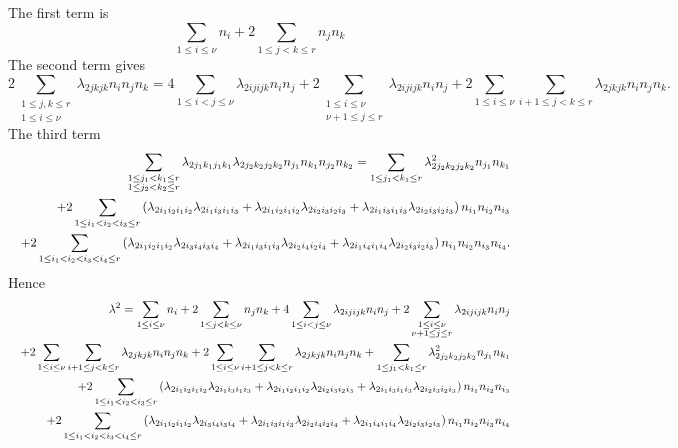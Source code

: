 \documentclass[12pt]{article}
\begin{document}
The first term is 
\begin{equation}
\sum_{1\leq i\leq \nu }n_{i}+2\sum_{1\leq j<k\leq r}n_{j}n_{k}
\end{equation}%
The second term gives 
\begin{equation}
2\sum_{\substack{ 1\leq j,k\leq r  \\ 1\leq i\leq \nu }}\lambda
_{2jkjk}n_{i}n_{j}n_{k}=4\sum_{1\leq i<j\leq \nu }\lambda
_{2ijijk}n_{i}n_{j}+2\sum_{\substack{ 1\leq i\leq \nu  \\ \nu +1\leq j\leq r 
}}\lambda _{2ijijk}n_{i}n_{j}+2\sum_{1\leq i\leq \nu }\sum_{i+1\leq j<k\leq
r}\lambda _{2jkjk}n_{i}n_{j}n_{k}.
\end{equation}%
The third term 
\begin{eqnarray}
&&\sum_{\substack{ 1\leq j_{1}<k_{1}\leq r  \\ 1\leq j_{2}<k_{2}\leq r}}%
\lambda _{2j_{1}k_{1}j_{1}k_{1}}\lambda
_{2j_{2}k_{2}j_{2}k_{2}}n_{j_{1}}n_{k_{1}}n_{j_{2}}n_{k_{2}}=\sum_{1\leq
j_{1}<k_{1}\leq r}\lambda _{2j_{2}k_{2}j_{2}k_{2}}^{2}n_{j_{1}}n_{k_{1}} 
\notag \\
&&+2\sum_{1\leq i_{1}<i_{2}<i_{3}\leq r}\left( \lambda
_{2i_{1}i_{2}i_{1}i_{2}}\lambda _{2i_{1}i_{3}i_{1}i_{3}}+\lambda
_{2i_{1}i_{2}i_{1}i_{2}}\lambda _{2i_{2}i_{3}i_{2}i_{3}}+\lambda
_{2i_{1}i_{3}i_{1}i_{3}}\lambda _{2i_{2}i_{3}i_{2}i_{3}}\right)
n_{i_{1}}n_{i_{2}}n_{i_{3}}  \notag \\
&&+2\sum_{1\leq i_{1}<i_{2}<i_{3}<i_{4}\leq r}\left( \lambda
_{2i_{1}i_{2}i_{1}i_{2}}\lambda _{2i_{3}i_{4}i_{3}i_{4}}+\lambda
_{2i_{1}i_{3}i_{1}i_{3}}\lambda _{2i_{2}i_{4}i_{2}i_{4}}+\lambda
_{2i_{1}i_{4}i_{1}i_{4}}\lambda _{2i_{2}i_{3}i_{2}i_{3}}\right)
n_{i_{1}}n_{i_{2}}n_{i_{3}}n_{i_{4}}.
\end{eqnarray}%
Hence%
\begin{eqnarray}
&&\lambda ^{2}=\sum_{1\leq i\leq \nu }n_{i}+2\sum_{1\leq j<k\leq \nu
}n_{j}n_{k}+4\sum_{1\leq i<j\leq \nu }\lambda _{2ijijk}n_{i}n_{j}+2\sum 
_{\substack{ 1\leq i\leq \nu  \\ \nu +1\leq j\leq r}}\lambda
_{2ijijk}n_{i}n_{j}  \notag \\
&&+2\sum_{1\leq i\leq \nu }\sum_{i+1\leq j<k\leq r}\lambda
_{2jkjk}n_{i}n_{j}n_{k}+2\sum_{1\leq i\leq \nu }\sum_{i+1\leq j<k\leq
r}\lambda _{2jkjk}n_{i}n_{j}n_{k}+\sum_{1\leq j_{1}<k_{1}\leq r}\lambda
_{2j_{2}k_{2}j_{2}k_{2}}^{2}n_{j_{1}}n_{k_{1}}  \notag \\
&&+2\sum_{1\leq i_{1}<i_{2}<i_{3}\leq r}\left( \lambda
_{2i_{1}i_{2}i_{1}i_{2}}\lambda _{2i_{1}i_{3}i_{1}i_{3}}+\lambda
_{2i_{1}i_{2}i_{1}i_{2}}\lambda _{2i_{2}i_{3}i_{2}i_{3}}+\lambda
_{2i_{1}i_{3}i_{1}i_{3}}\lambda _{2i_{2}i_{3}i_{2}i_{3}}\right)
n_{i_{1}}n_{i_{2}}n_{i_{3}}  \notag \\
&&+2\sum_{1\leq i_{1}<i_{2}<i_{3}<i_{4}\leq r}\left( \lambda
_{2i_{1}i_{2}i_{1}i_{2}}\lambda _{2i_{3}i_{4}i_{3}i_{4}}+\lambda
_{2i_{1}i_{3}i_{1}i_{3}}\lambda _{2i_{2}i_{4}i_{2}i_{4}}+\lambda
_{2i_{1}i_{4}i_{1}i_{4}}\lambda _{2i_{2}i_{3}i_{2}i_{3}}\right)
n_{i_{1}}n_{i_{2}}n_{i_{3}}n_{i_{4}}
\end{eqnarray}%
\end{document}
